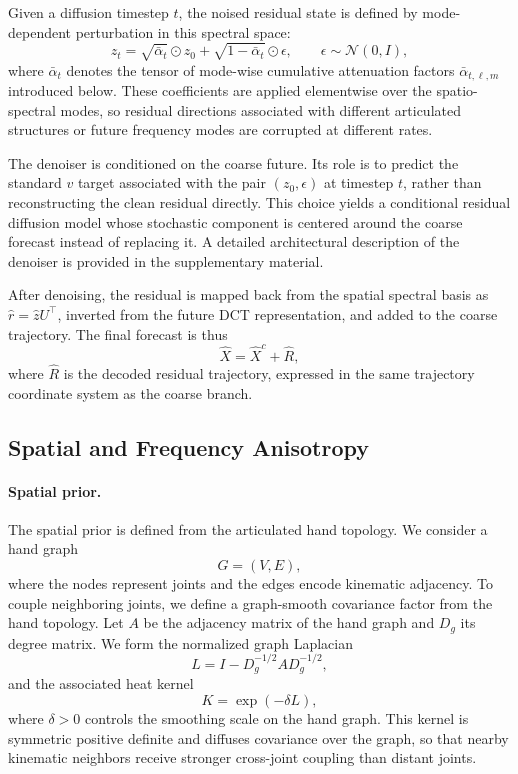 \documentclass[runningheads]{llncs}
\begin{document}
Given a diffusion timestep $t$, the noised residual state is defined by mode-dependent perturbation in this spectral space:
\[
z_t =
\sqrt{\bar{\alpha}_t}\odot z_0
+
\sqrt{1-\bar{\alpha}_t}\odot \epsilon,
\qquad
\epsilon \sim \mathcal{N}(0,I),
\]
where $\bar{\alpha}_t$ denotes the tensor of mode-wise cumulative attenuation factors $\bar{\alpha}_{t,\ell,m}$ introduced below. These coefficients are applied elementwise over the spatio-spectral modes, so residual directions associated with different articulated structures or future frequency modes are corrupted at different rates.

The denoiser is conditioned on the coarse future. Its role is to predict the standard $v$ target associated with the pair $(z_0,\epsilon)$ at timestep $t$, rather than reconstructing the clean residual directly. This choice yields a conditional residual diffusion model whose stochastic component is centered around the coarse forecast instead of replacing it. A detailed architectural description of the denoiser is provided in the supplementary material.

After denoising, the residual is mapped back from the spatial spectral basis as $\hat{r}=\hat{z}U^\top$, inverted from the future DCT representation, and added to the coarse trajectory. The final forecast is thus
\[
\hat{X} = \hat{X}^{c} + \hat{R},
\]
where $\hat{R}$ is the decoded residual trajectory, expressed in the same trajectory coordinate system as the coarse branch.

\subsection{Spatial and Frequency Anisotropy}
\label{sec:method_anisotropy}

\paragraph{Spatial prior.}
The spatial prior is defined from the articulated hand topology. We consider a hand graph
\[
G = (V,E),
\]
where the nodes represent joints and the edges encode kinematic adjacency. To couple neighboring joints, we define a graph-smooth covariance factor from the hand topology. Let \(A\) be the adjacency matrix of the hand graph and \(D_g\) its degree matrix. We form the normalized graph Laplacian \cite{chung1997spectral}
\[
L = I - D_g^{-1/2} A D_g^{-1/2},
\]
and the associated heat kernel
\[
K = \exp(-\delta L),
\]
where \(\delta>0\) controls the smoothing scale on the hand graph. This kernel is symmetric positive definite and diffuses covariance over the graph, so that nearby kinematic neighbors receive stronger cross-joint coupling than distant joints.
\end{document}
